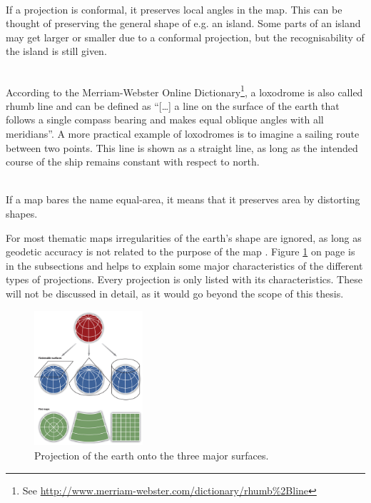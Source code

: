 \begin{enumerate}

 \hfill \\
If a projection is conformal, it preserves local angles in the map. This can be thought of preserving the general shape of e.g. an island. Some parts of an island may get larger or smaller due to a conformal projection, but the recognisability of the island is still given.

 \hfill \\
According to the Merriam-Webster Online Dictionary\footnote{See \href{http://www.merriam-webster.com/dictionary/rhumb\%2Bline}{http://www.merriam-webster.com/dictionary/rhumb\%2Bline}}, a loxodrome is also called rhumb line and can be defined as ``[\ldots] a line on the surface of the earth that follows a single compass bearing and makes equal oblique angles with all meridians''. A more practical example of loxodromes is to imagine a sailing route between two points. This line is shown as a straight line, as long as the intended course of the ship remains constant with respect to north.

 \hfill \\
If a map bares the name equal-area, it means that it preserves area by distorting shapes.

\end{enumerate}

For most thematic maps irregularities of the earth's shape are ignored, as long as geodetic accuracy is not related to the purpose of the map . Figure \ref{fig:projections-base} on page \pageref{fig:projections-base} is in the subsections and helps to explain some major characteristics of the different types of projections. Every projection is only listed with its characteristics. These will not be discussed in detail, as it would go beyond the scope of this thesis.

\begin{figure}[!htb]
\centering
\includegraphics[height=5cm,keepaspectratio]{images/methods/projections/overview.jpg}
\caption[
    Projection of the earth onto the three major surfaces, Urldate: 08.2016 \newline
    \small\texttt{\url{http://images.flatworldknowledge.com/campbell/campbell-fig02_011.jpg}}.
]{Projection of the earth onto the three major surfaces.}
\label{fig:projections-base}
\end{figure}

